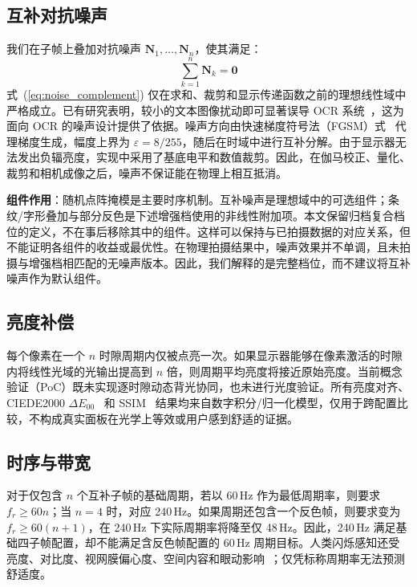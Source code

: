 \subsection{互补对抗噪声}

我们在子帧上叠加对抗噪声 $\mathbf{N}_1, \ldots, \mathbf{N}_n$，使其满足：
\begin{equation}
\sum_{k=1}^{n}\mathbf{N}_k = \mathbf{0}
\label{eq:noise_complement}
\end{equation}
式~(\ref{eq:noise_complement}) 仅在求和、裁剪和显示传递函数之前的理想线性域中严格成立。已有研究表明，较小的文本图像扰动即可显著误导 OCR 系统~\cite{b_song2018}，这为面向 OCR 的噪声设计提供了依据。噪声方向由快速梯度符号法（FGSM）式~\cite{b_goodfellow2015} 代理梯度生成，幅度上界为 $\varepsilon=8/255$，随后在时域中进行互补分解。由于显示器无法发出负辐亮度，实现中采用了基底电平和数值裁剪。因此，在伽马校正、量化、裁剪和相机成像之后，噪声不保证能在物理上相互抵消。

\textbf{组件作用}：随机点阵掩模是主要时序机制。互补噪声是理想域中的可选组件；条纹/字形叠加与部分反色是下述增强档使用的非线性附加项。本文保留归档复合档位的定义，不在事后移除其中的组件。这样可以保持与已拍摄数据的对应关系，但不能证明各组件的收益或最优性。在物理拍摄结果中，噪声效果并不单调，且未拍摄与增强档相匹配的无噪声版本。因此，我们解释的是完整档位，而不建议将互补噪声作为默认组件。

\subsection{亮度补偿}

每个像素在一个 $n$ 时隙周期内仅被点亮一次。如果显示器能够在像素激活的时隙内将线性光域的光输出提高到 $n$ 倍，则周期平均亮度将接近原始亮度。当前概念验证（PoC）既未实现逐时隙动态背光协同，也未进行光度验证。所有亮度对齐、CIEDE2000 $\Delta E_{00}$~\cite{b_ciede2000} 和 SSIM~\cite{b_wang2004} 结果均来自数字积分/归一化模型，仅用于跨配置比较，不构成真实面板在光学上等效或用户感到舒适的证据。

\subsection{时序与带宽}

对于仅包含 $n$ 个互补子帧的基础周期，若以 60\,Hz 作为最低周期率，则要求 $f_r\geq60n$；当 $n=4$ 时，对应 240\,Hz。如果周期还包含一个反色帧，则要求变为 $f_r\geq60(n+1)$，在 240\,Hz 下实际周期率将降至仅 48\,Hz。因此，240\,Hz 满足基础四子帧配置，却不能满足含反色帧配置的 60\,Hz 周期目标。人类闪烁感知还受亮度、对比度、视网膜偏心度、空间内容和眼动影响~\cite{b_cai2024,b_davis2015}；仅凭标称周期率无法预测舒适度。

